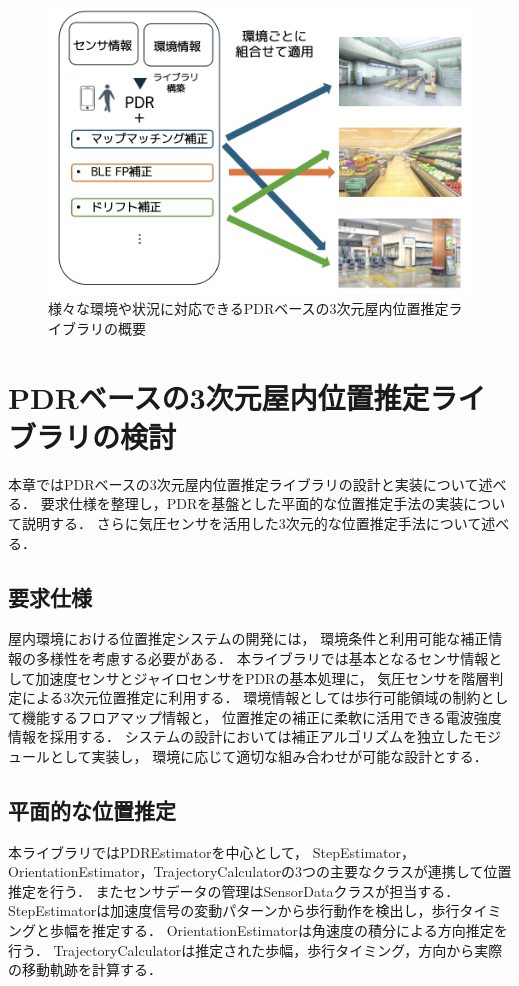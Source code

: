 \documentclass[a4paper, 10pt, twocolumn]{jarticle}
\begin{document}
\begin{figure}[h]
	\centering
	\includegraphics[width=\linewidth]{image/first.png}
	\caption{様々な環境や状況に対応できるPDRベースの3次元屋内位置推定ライブラリの概要}    \label{fig:overview}
\end{figure}


\section{PDRベースの3次元屋内位置推定ライブラリの検討}
本章ではPDRベースの3次元屋内位置推定ライブラリの設計と実装について述べる．
要求仕様を整理し，PDRを基盤とした平面的な位置推定手法の実装について説明する．
さらに気圧センサを活用した3次元的な位置推定手法について述べる．


\subsection{要求仕様}
屋内環境における位置推定システムの開発には，
環境条件と利用可能な補正情報の多様性を考慮する必要がある．
本ライブラリでは基本となるセンサ情報として加速度センサとジャイロセンサをPDRの基本処理に，
気圧センサを階層判定による3次元位置推定に利用する．
環境情報としては歩行可能領域の制約として機能するフロアマップ情報と，
位置推定の補正に柔軟に活用できる電波強度情報を採用する．
システムの設計においては補正アルゴリズムを独立したモジュールとして実装し，
環境に応じて適切な組み合わせが可能な設計とする．


\subsection{平面的な位置推定}
本ライブラリではPDREstimatorを中心として，
StepEstimator，OrientationEstimator，TrajectoryCalculatorの3つの主要なクラスが連携して位置推定を行う．
またセンサデータの管理はSensorDataクラスが担当する．
StepEstimatorは加速度信号の変動パターンから歩行動作を検出し，歩行タイミングと歩幅を推定する．
OrientationEstimatorは角速度の積分による方向推定を行う．
TrajectoryCalculatorは推定された歩幅，歩行タイミング，方向から実際の移動軌跡を計算する．
\end{document}
